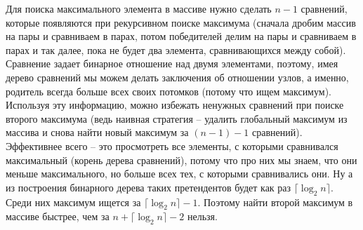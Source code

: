 \begin{enumerate}
\begin{solution}
        Для поиска максимального элемента в массиве нужно сделать $n-1$ сравнений, которые появляются при рекурсивном поиске максимума (сначала дробим массив на пары и сравниваем в парах, потом победителей делим на пары и сравниваем в парах и так далее, пока не будет два элемента, сравнивающихся между собой). Сравнение задает бинарное отношение над двумя элементами, поэтому, имея дерево сравнений мы можем делать заключения об отношении узлов, а именно, родитель всегда больше всех своих потомков (потому что ищем максимум). Используя эту информацию, можно избежать ненужных сравнений при поиске второго максимума (ведь наивная стратегия -- удалить глобальный максимум из массива и снова найти новый максимум за $(n-1)-1$ сравнений). Эффективнее всего -- это просмотреть все элементы, с которыми сравнивался максимальный (корень дерева сравнений), потому что про них мы знаем, что они меньше максимального, но больше всех тех, с которыми сравнивались они. Ну а из построения бинарного дерева таких претендентов будет как раз $\lceil \log_2 n \rceil$. Среди них максимум ищется за $\lceil \log_2 n \rceil - 1$. Поэтому найти второй максимум в массиве быстрее, чем за $n + \lceil \log_2 n \rceil - 2$ нельзя.
    \end{solution}
\end{enumerate}

